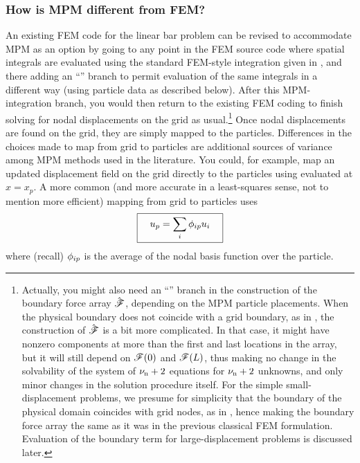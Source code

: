\subsubsection{How is MPM different from FEM?}
An existing FEM code for the linear bar problem can be revised to accommodate MPM as an option by going to any point in the FEM source code where spatial integrals are evaluated using the standard FEM-style integration given in , and there adding an ``'' branch to permit evaluation of the same integrals in a different way (using particle data as described below). After this MPM-integration branch, you would then return to the existing FEM coding to finish solving for nodal displacements on the grid as usual.\footnote{Actually, you might also need an ``'' branch in the construction of the boundary force array $\hat{\bm{\mathscr{F}}}$, depending on the MPM particle placements. 
%
When the physical boundary does not coincide with a grid boundary, as in , the construction of $\hat{\bm{\mathscr{F}}}$ is a bit more complicated. In that case, it might have nonzero components at more than the first and last locations in the array, but it will still depend on $\mathscr{F}(0)$ and $\mathscr{F}(L)$, thus making no change in the solvability of the system of ${\nu_\text{n}}+2$ equations for ${\nu_\text{n}}+2$ unknowns, and only minor changes in the solution procedure itself.
%
For the simple \oneD small-displacement problems, we presume for simplicity that the boundary of the physical domain coincides with grid nodes, as in , hence making the boundary force array the same as it was in the previous classical FEM formulation. Evaluation of the boundary term for large-displacement problems is discussed later.}
Once nodal displacements are found on the grid, they are simply mapped to the particles. Differences in the choices made to map from grid to particles are additional sources of variance among MPM methods used in the literature. You could, for example, map an updated displacement field on the grid directly to the particles using  evaluated at $x=x_p$. A more common (and more accurate in a least-squares sense, not to mention more efficient) mapping from grid to particles uses
\begin{equation}
 \boxed{\quad u_p=\sum_i {\phi_{ip}} u_i \quad}
\end{equation}
where (recall) ${\phi_{ip}}$ is the average of the \ith nodal basis function over the \pth particle. 

